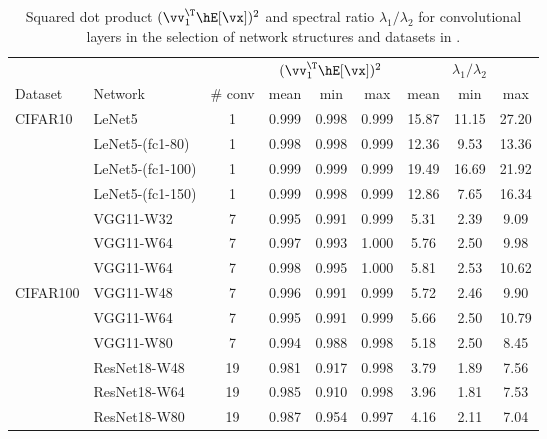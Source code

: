 \begin{table}[h]
\small
  \centering
  \caption{Squared dot product $(\vv_1^\T\hE[\vx])^2$ and spectral ratio $\lambda_1/\lambda_2$ for convolutional layers in the selection of network structures and datasets in .}
  \vskip 0.1in
    \begin{center}
    \begin{tabular}{llccccccc}
\toprule
         &                  &         & \multicolumn{3}{c}{$(\vv_1^\T\hE[\vx])^2$} & \multicolumn{3}{c}{$\lambda_1/\lambda_2$} \\
Dataset  & Network          & \# conv & mean        & min         & max         & mean         & min          & max         \\
\midrule
CIFAR10  & LeNet5           & 1       & 0.999       & 0.998       & 0.999       & 15.87        & 11.15        & 27.20       \\
         & LeNet5-(fc1-80)  & 1       & 0.998       & 0.998       & 0.999       & 12.36        & 9.53         & 13.36       \\
         & LeNet5-(fc1-100) & 1       & 0.999       & 0.999       & 0.999       & 19.49        & 16.69        & 21.92       \\
         & LeNet5-(fc1-150) & 1       & 0.999       & 0.998       & 0.999       & 12.86        & 7.65         & 16.34       \\
         & VGG11-W32        & 7       & 0.995       & 0.991       & 0.999       & 5.31         & 2.39         & 9.09        \\
         & VGG11-W64        & 7       & 0.997       & 0.993       & 1.000       & 5.76         & 2.50         & 9.98        \\
         & VGG11-W64        & 7       & 0.998       & 0.995       & 1.000       & 5.81         & 2.53         & 10.62       \\
\midrule
CIFAR100 & VGG11-W48        & 7       & 0.996       & 0.991       & 0.999       & 5.72         & 2.46         & 9.90        \\
         & VGG11-W64        & 7       & 0.995       & 0.991       & 0.999       & 5.66         & 2.50         & 10.79       \\
         & VGG11-W80        & 7       & 0.994       & 0.988       & 0.998       & 5.18         & 2.50         & 8.45        \\
         & ResNet18-W48     & 19      & 0.981       & 0.917       & 0.998       & 3.79         & 1.89         & 7.56        \\
         & ResNet18-W64     & 19      & 0.985       & 0.910       & 0.998       & 3.96         & 1.81         & 7.53        \\
         & ResNet18-W80     & 19      & 0.987       & 0.954       & 0.997       & 4.16         & 2.11         & 7.04        \\ \bottomrule
\end{tabular}
\vspace{-0.15in}
\end{center}
  \label{tab:appendix_xxT_spec_conv}%
\end{table}

